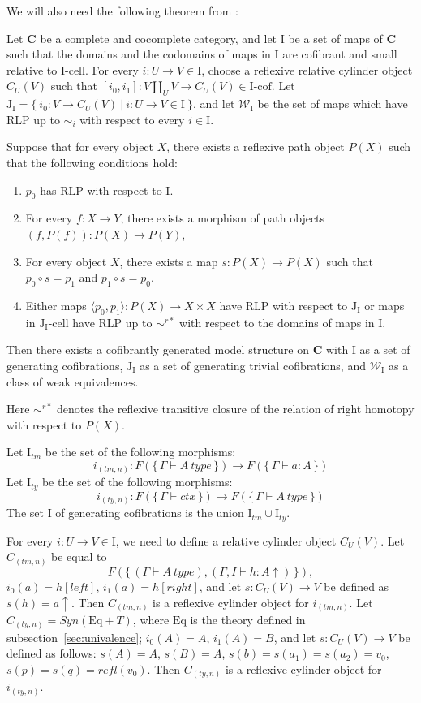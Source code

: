 \documentclass[reqno]{amsart}
\theoremstyle{definition}
\theoremstyle{remark}
\newcommand{\Eq}{\mathrm{Eq}}
\newcommand{\cat}[1]{\mathbf{#1}}
\newcommand{\C}{\cat{C}}
\newcommand{\we}{\mathcal{W}}
\newcommand{\I}{\mathrm{I}}
\newcommand{\J}{\mathrm{J}}
\newcommand{\class}[2]{#1\text{-}\mathrm{#2}}
\newcommand{\Icell}[1][\I]{\class{#1}{cell}}
\newcommand{\Icof}[1][\I]{\class{#1}{cof}}
\newcommand{\Jcell}[1][]{\Icell[\J#1]}
\newcommand{\cyli}{i}
\numberwithin{figure}{section}
\begin{document}
We will also need the following theorem from \cite{f-model-structures}:
\begin{thm}
Let $\C$ be a complete and cocomplete category, and let $\I$ be a set of maps of $\C$
such that the domains and the codomains of maps in $\I$ are cofibrant and small relative to $\Icell$.
For every $i : U \to V \in \I$, choose a reflexive relative cylinder object $C_U(V)$
such that $[\cyli_0,\cyli_1] : V \amalg_U V \to C_U(V) \in \Icof$.
Let $\J_\I = \{\ \cyli_0 : V \to C_U(V)\ |\ i : U \to V \in \I \ \}$, and
let $\we_\I$ be the set of maps which have RLP up to $\sim_i$ with respect to every $i \in \I$.

Suppose that for every object $X$, there exists a reflexive path object $P(X)$ such that the following conditions hold:
\begin{enumerate}
\item $p_0$ has RLP with respect to $\I$.
\item For every $f : X \to Y$, there exists a morphism of path objects $(f,P(f)) : P(X) \to P(Y)$,
\item For every object $X$, there exists a map $s : P(X) \to P(X)$ such that $p_0 \circ s = p_1$ and $p_1 \circ s = p_0$.
\item Either maps $\langle p_0, p_1 \rangle : P(X) \to X \times X$ have RLP with respect to $\J_\I$
or maps in $\Jcell[_\I]$ have RLP up to $\sim^{r*}$ with respect to the domains of maps in $\I$.
\end{enumerate}
Then there exists a cofibrantly generated model structure on $\C$ with $\I$ as a set of generating cofibrations,
$\J_\I$ as a set of generating trivial cofibrations, and $\we_\I$ as a class of weak equivalences.
\end{thm}
Here $\sim^{r*}$ denotes the reflexive transitive closure of the relation of right homotopy with respect to $P(X)$.

Let $\I_{tm}$ be the set of the following morphisms:
\[ i_{(tm,n)} : F(\{\,\Gamma \vdash A\ type\,\}) \to F(\{\,\Gamma \vdash a : A\,\}) \]
Let $\I_{ty}$ be the set of the following morphisms:
\[ i_{(ty,n)} : F(\{\,\Gamma \vdash ctx\,\}) \to F(\{\,\Gamma \vdash A\ type\,\}) \]
The set $\I$ of generating cofibrations is the union $\I_{tm} \cup \I_{ty}$.

For every $i : U \to V \in \I$, we need to define a relative cylinder object $C_U(V)$.
Let $C_{(tm,n)}$ be equal to
\[ F(\{\,(\Gamma \vdash A\ type), (\Gamma, I \vdash h : A\!\uparrow)\,\}), \]
$\cyli_0(a) = h[left]$, $\cyli_1(a) = h[right]$, and let $s : C_U(V) \to V$ be defined as $s(h) = a\!\uparrow$.
Then $C_{(tm,n)}$ is a reflexive cylinder object for $i_{(tm,n)}$.
Let $C_{(ty,n)} = Syn(\Eq + T)$, where $\Eq$ is the theory defined in subsection~\ref{sec:univalence};
$\cyli_0(A) = A$, $\cyli_1(A) = B$, and let $s : C_U(V) \to V$ be defined as follows:
$s(A) = A$, $s(B) = A$, $s(b) = s(a_1) = s(a_2) = v_0$, $s(p) = s(q) = refl(v_0)$.
Then $C_{(ty,n)}$ is a reflexive cylinder object for $i_{(ty,n)}$.
\end{document}
